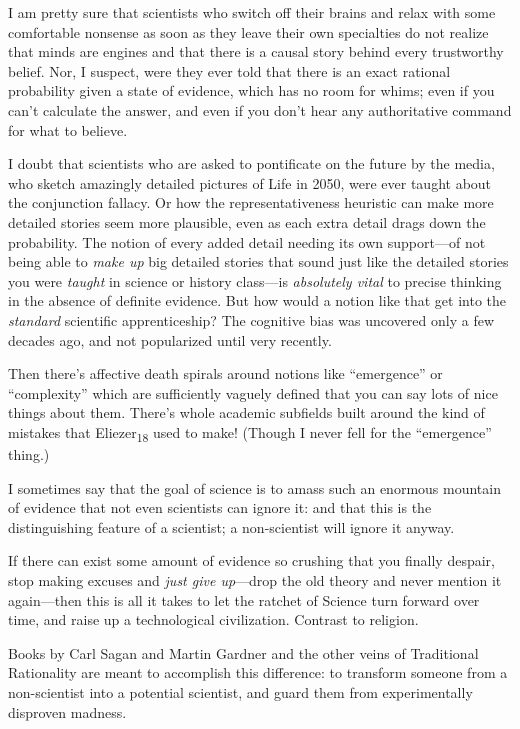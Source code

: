 {
 I am pretty sure that scientists who switch off their brains and
relax with some comfortable nonsense as soon as they leave their own
specialties do not realize that minds are engines and that there is a
causal story behind every trustworthy belief. Nor, I suspect, were they
ever told that there is an exact rational probability given a state of
evidence, which has no room for whims; even if you
can't calculate the answer, and even if you
don't hear any authoritative command for what to
believe.}

{
 I doubt that scientists who are asked to pontificate on the future
by the media, who sketch amazingly detailed pictures of Life in 2050,
were ever taught about the conjunction fallacy. Or how the
representativeness heuristic can make more detailed stories seem more
plausible, even as each extra detail drags down the probability. The
notion of every added detail needing its own support---of not being
able to \textit{make up} big detailed stories that sound just like the
detailed stories you were \textit{taught} in science or history
class---is \textit{absolutely vital} to precise thinking in the absence
of definite evidence. But how would a notion like that get into the
\textit{standard} scientific apprenticeship? The cognitive bias was
uncovered only a few decades ago, and not popularized until very
recently.}

{
 Then there's affective death spirals around
notions like ``emergence'' or
``complexity'' which are
sufficiently vaguely defined that you can say lots of nice things about
them. There's whole academic subfields built around the
kind of mistakes that Eliezer\textsubscript{18} used to make! (Though I
never fell for the ``emergence''
thing.)}

{
 I sometimes say that the goal of science is to amass such an
enormous mountain of evidence that not even scientists can ignore it:
and that this is the distinguishing feature of a scientist; a
non-scientist will ignore it anyway.}

{
 If there can exist some amount of evidence so crushing that you
finally despair, stop making excuses and \textit{just give up}{}---drop
the old theory and never mention it again---then this is all it takes
to let the ratchet of Science turn forward over time, and raise up a
technological civilization. Contrast to religion.}

{
 Books by Carl Sagan and Martin Gardner and the other veins of
Traditional Rationality are meant to accomplish this difference: to
transform someone from a non-scientist into a potential scientist, and
guard them from experimentally disproven madness.}

